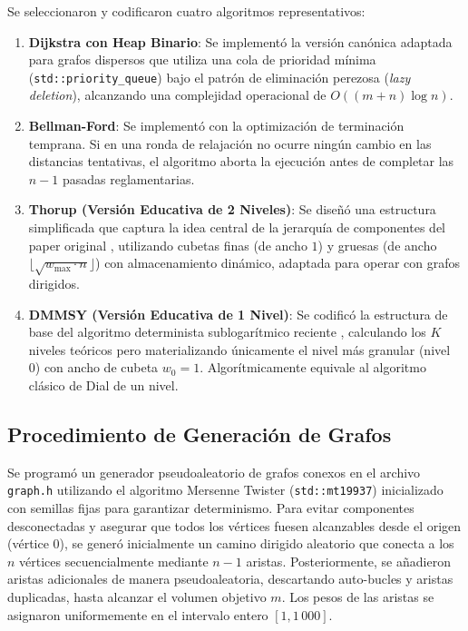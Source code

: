 \documentclass[conference]{IEEEtran}
\begin{document}
Se seleccionaron y codificaron cuatro algoritmos representativos:
\begin{enumerate}
    \item \textbf{Dijkstra con Heap Binario}: Se implementó la versión canónica adaptada para grafos dispersos que utiliza una cola de prioridad mínima (\lstinline{std::priority_queue}) bajo el patrón de eliminación perezosa (\textit{lazy deletion}), alcanzando una complejidad operacional de $O((m+n)\log n)$.
    \item \textbf{Bellman-Ford}: Se implementó con la optimización de terminación temprana. Si en una ronda de relajación no ocurre ningún cambio en las distancias tentativas, el algoritmo aborta la ejecución antes de completar las $n-1$ pasadas reglamentarias.
    \item \textbf{Thorup (Versión Educativa de 2 Niveles)}: Se diseñó una estructura simplificada que captura la idea central de la jerarquía de componentes del paper original \cite{thorup1999}, utilizando cubetas finas (de ancho $1$) y gruesas (de ancho $\lfloor\sqrt{w_{\max}\cdot n}\rfloor$) con almacenamiento dinámico, adaptada para operar con grafos dirigidos.
    \item \textbf{DMMSY (Versión Educativa de 1 Nivel)}: Se codificó la estructura de base del algoritmo determinista sublogarítmico reciente \cite{duan2025}, calculando los $K$ niveles teóricos pero materializando únicamente el nivel más granular (nivel 0) con ancho de cubeta $w_0=1$. Algorítmicamente equivale al algoritmo clásico de Dial de un nivel.
\end{enumerate}

\subsection{Procedimiento de Generación de Grafos}

Se programó un generador pseudoaleatorio de grafos conexos en el archivo \texttt{graph.h} utilizando el algoritmo Mersenne Twister (\lstinline{std::mt19937}) inicializado con semillas fijas para garantizar determinismo. Para evitar componentes desconectadas y asegurar que todos los vértices fuesen alcanzables desde el origen (vértice $0$), se generó inicialmente un camino dirigido aleatorio que conecta a los $n$ vértices secuencialmente mediante $n-1$ aristas. Posteriormente, se añadieron aristas adicionales de manera pseudoaleatoria, descartando auto-bucles y aristas duplicadas, hasta alcanzar el volumen objetivo $m$. Los pesos de las aristas se asignaron uniformemente en el intervalo entero $[1, 1\,000]$.
\end{document}
